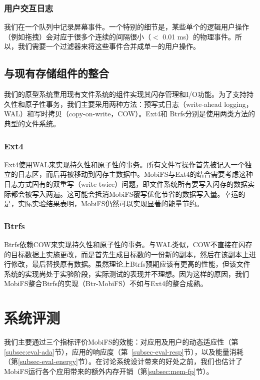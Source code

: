 \subsubsection{用户交互日志}
我们在一个队列中记录屏幕事件。一个特别的细节是，某些单个的逻辑用户操作（例如拖拽）会对应于很多个连续的间隔很小（$<$ 0.01 ms）的物理事件。所以，我们需要一个过滤器来将这些事件合并成单一的用户操作。

\subsection{与现有存储组件的整合}
\label{subsec:ext4}

我们的原型系统重用现有文件系统的组件实现其闪存管理和I/O功能。为了支持持久性和原子性事务，我们主要采用两种方法：预写式日志（write-ahead logging，WAL）和写时拷贝（copy-on-write，COW）。Ext4和 Btrfs分别是使用两类方法的典型的文件系统。

\subsubsection{Ext4}
Ext4使用WAL来实现持久性和原子性的事务。所有文件写操作首先被记入一个独立的日志区，而后再被移动到闪存主数据中。MobiFS与Ext4的结合需要考虑这种日志方式固有的双重写（write-twice）问题，即文件系统所有要写入闪存的数据实际都会被写入两遍。这可能会抵消MobiFS覆写优化节省的数据写入量。幸运的是，实际实验结果表明，MobiFS仍然可以实现显著的能量节约。

\subsubsection{Btrfs}
Btrfs依赖COW来实现持久性和原子性的事务。与WAL类似，COW不直接在闪存的目标数据上实施更改，而是首先生成目标数的一份新的副本，然后在该副本上进行修改，最后替换原有数据。虽然理论上Btrfs预期应该有更高的性能，但该文件系统的实现尚处于实验阶段，实际测试的表现并不理想。因为这样的原因，我们MobiFS整合Btrfs的实现（Btr-MobiFS）不如与Ext4的整合成熟。

\section{系统评测}
\label{sec-eval}

我们主要通过三个指标评价MobiFS的效能：对应用及用户的动态适应性（第\ref{subsec:eval-ada}节），应用的响应度（第~\ref{subsec-eval-resp}节），以及能量消耗（第\ref{subsec-eval-energy}节）。在讨论系统设计带来的好处之前，我们也估计了MobiFS运行各个应用带来的额外内存开销（第\ref{subsec:mem-fp}节）。


